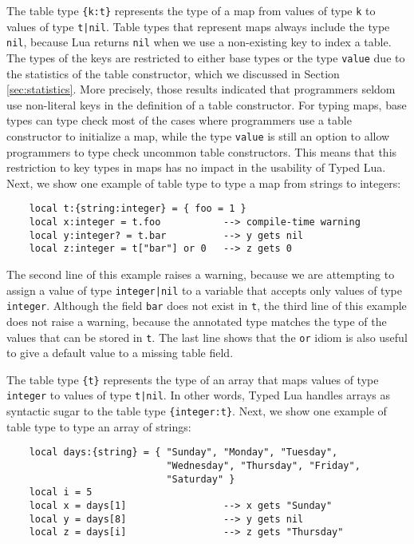The table type \texttt{\{k:t\}} represents the type of a map
from values of type \texttt{k} to values of type \texttt{t|nil}.
Table types that represent maps always include the type \texttt{nil},
because Lua returns \texttt{nil} when we use a non-existing key to
index a table. 
The types of the keys are restricted to either base types or the
type \texttt{value} due to the statistics of the table constructor,
which we discussed in Section \ref{sec:statistics}.
More precisely, those results indicated that programmers seldom
use non-literal keys in the definition of a table constructor.
For typing maps, base types can type check most of the cases where
programmers use a table constructor to initialize a map,
while the type \texttt{value} is still an option to allow programmers
to type check uncommon table constructors.
This means that this restriction to key types in maps has no
impact in the usability of Typed Lua.
Next, we show one example of table type to type a map from strings to integers:
\begin{verbatim}
    local t:{string:integer} = { foo = 1 } 
    local x:integer = t.foo           --> compile-time warning
    local y:integer? = t.bar          --> y gets nil
    local z:integer = t["bar"] or 0   --> z gets 0 
\end{verbatim}

The second line of this example raises a warning, because we are
attempting to assign a value of type \texttt{integer|nil} to a
variable that accepts only values of type \texttt{integer}.
Although the field \texttt{bar} does not exist in \texttt{t}, the third
line of this example does not raise a warning, because the
annotated type matches the type of the values that can be stored in
\texttt{t}.
The last line shows that the \texttt{or} idiom is also useful to
give a default value to a missing table field.

The table type \texttt{\{t\}} represents the type of an array that 
maps values of type \texttt{integer} to values of type \texttt{t|nil}.
In other words, Typed Lua handles arrays as syntactic sugar to the
table type \texttt{\{integer:t\}}.
Next, we show one example of table type to type an array of strings:
\begin{verbatim}
    local days:{string} = { "Sunday", "Monday", "Tuesday",
                            "Wednesday", "Thursday", "Friday",
                            "Saturday" }
    local i = 5
    local x = days[1]                 --> x gets "Sunday"
    local y = days[8]                 --> y gets nil
    local z = days[i]                 --> z gets "Thursday"
\end{verbatim}

